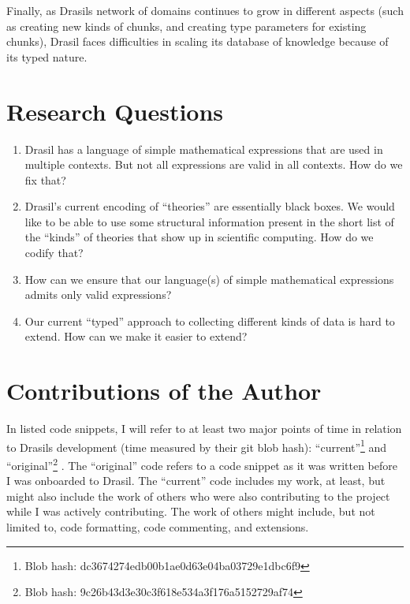 Finally, as Drasils network of domains continues to grow in different aspects
(such as creating new kinds of chunks, and creating type parameters for existing
chunks), Drasil faces difficulties in scaling its database of knowledge because
of its typed nature.

\section{Research Questions}
\label{sec:intro:researchquestions}



\begin{enumerate}

      \item[\namedlabel{rq:lang_division}{RQ1}] Drasil has a language of simple
            mathematical expressions that are used in multiple contexts. But not
            all expressions are valid in all contexts. How do we fix that?

      \item[\namedlabel{rq:modelkinds}{RQ2}] Drasil's current encoding of
            ``theories'' are essentially black boxes. We would like to be able
            to use some structural information present in the short list of the
            ``kinds'' of theories that show up in scientific computing. How do
            we codify that?

      \item[\namedlabel{rq:typing}{RQ3}] How can we ensure that our language(s)
            of simple mathematical expressions admits only valid expressions?

      \item[\namedlabel{rq:chunkdb}{RQ4}] Our current ``typed'' approach to
            collecting different kinds of data is hard to extend. How can we
            make it easier to extend?

\end{enumerate}

\section{Contributions of the Author}
\label{sec:intro:contributions}

In listed code snippets, I will refer to at least two major points of time in
relation to Drasils development (time measured by their git blob hash):
``current''\footnote{Blob hash: dc3674274edb00b1ae0d63e04ba03729e1dbc6f9} and
``original''\footnote{Blob hash: 9c26b43d3e30c3f618e534a3f176a5152729af74}
. The ``original'' code refers
to a code snippet as it was written before I was onboarded to Drasil. The
``current'' code includes my work, at least, but might also include the work of
others who were also contributing to the project while I was actively
contributing. The work of others might include, but not limited to, code
formatting, code commenting, and extensions.

